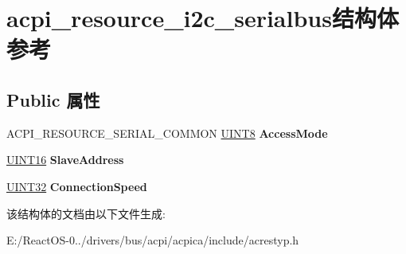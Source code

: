 \hypertarget{structacpi__resource__i2c__serialbus}{}\section{acpi\+\_\+resource\+\_\+i2c\+\_\+serialbus结构体 参考}
\label{structacpi__resource__i2c__serialbus}
\subsection*{Public 属性}
\begin{DoxyCompactItemize}
\item 
\mbox{\label{structacpi__resource__i2c__serialbus_aaac0e54c7e0e03d89107c8281dbf0aa9}} 
A\+C\+P\+I\+\_\+\+R\+E\+S\+O\+U\+R\+C\+E\+\_\+\+S\+E\+R\+I\+A\+L\+\_\+\+C\+O\+M\+M\+ON \hyperlink{_processor_bind_8h_ab27e9918b538ce9d8ca692479b375b6a}{U\+I\+N\+T8} {\bfseries Access\+Mode}
\item 
\mbox{\label{structacpi__resource__i2c__serialbus_a3a04e21f378b57433dbcb2882c9fdbd9}} 
\hyperlink{_processor_bind_8h_a09f1a1fb2293e33483cc8d44aefb1eb1}{U\+I\+N\+T16} {\bfseries Slave\+Address}
\item 
\mbox{\label{structacpi__resource__i2c__serialbus_a97b9016f92e6d9dc5b7f0184dc58ae67}} 
\hyperlink{_processor_bind_8h_ae1e6edbbc26d6fbc71a90190d0266018}{U\+I\+N\+T32} {\bfseries Connection\+Speed}
\end{DoxyCompactItemize}


该结构体的文档由以下文件生成\+:\begin{DoxyCompactItemize}
\item 
E\+:/\+React\+O\+S-\/0../drivers/bus/acpi/acpica/include/acrestyp.\+h\end{DoxyCompactItemize}
